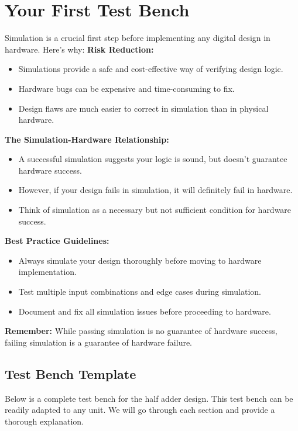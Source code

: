 \documentclass[12pt]{labmanual}
\begin{document}
\section{Your First Test Bench}
Simulation is a crucial first step before implementing any digital design in hardware. Here's why:
\hfill\break
\hfill\break
\noindent\textbf{Risk Reduction:}
\noindent
\begin{itemize}
    \item Simulations provide a safe and cost-effective way of verifying design logic.
    \item Hardware bugs can be expensive and time-consuming to fix.
    \item Design flaws are much easier to correct in simulation than in physical hardware.
\end{itemize}
\hfill\break
\hfill\break
\noindent\textbf{The Simulation-Hardware Relationship:}
\noindent
\begin{itemize}
    \item A successful simulation suggests your logic is sound, but doesn't guarantee hardware success.
    \item However, if your design fails in simulation, it will definitely fail in hardware.
    \item Think of simulation as a necessary but not sufficient condition for hardware success.
\end{itemize}
\hfill\break
\hfill\break
\noindent
\textbf{Best Practice Guidelines:}
\noindent
\begin{itemize}
    \item Always simulate your design thoroughly before moving to hardware implementation.
    \item Test multiple input combinations and edge cases during simulation.
    \item Document and fix all simulation issues before proceeding to hardware.
\end{itemize}
\hfill\break
\hfill\break
\textbf{Remember:} While passing simulation is no guarantee of hardware success, failing simulation is a guarantee of hardware failure.

\subsection{Test Bench Template}
Below is a complete test bench for the half adder design. This test bench can be readily adapted to any unit. We will go through each section and provide a thorough explanation.
\end{document}
